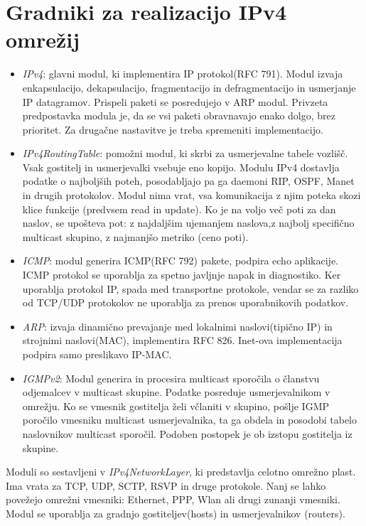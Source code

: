 \documentclass[11pt, a4paper, slovene]{book}
\begin{document}
\section{Gradniki za realizacijo IPv4 omrežij}
	\begin{itemize}
		\item\textit{IPv4}: glavni modul, ki implementira IP protokol(RFC 791). Modul izvaja enkapsulacijo, dekapsulacijo, fragmentacijo in defragmentacijo in usmerjanje IP datagramov. Prispeli paketi se posredujejo v ARP modul. Privzeta predpostavka modula je, da se vsi paketi obravnavajo enako dolgo, brez prioritet. Za drugačne nastavitve je treba spremeniti implementacijo.
		\item\textit{IPv4RoutingTable}: pomožni modul, ki skrbi za usmerjevalne tabele vozlišč. Vsak gostitelj in usmerjevalki vsebuje eno kopijo. Modulu IPv4 dostavlja podatke o najboljših poteh, posodabljajo pa ga daemoni RIP, OSPF, Manet in drugih protokolov. Modul nima vrat, vsa komunikacija z njim poteka skozi klice funkcije (predvsem read in update). Ko je na voljo več poti za dan naslov, se upošteva pot:
		z najdaljšim ujemanjem naslova,z najbolj specifično multicast skupino, z najmanjšo metriko (ceno poti).
		\item\textit{ICMP}: modul generira ICMP(RFC 792) pakete, podpira echo aplikacije. ICMP protokol se uporablja za spetno javljnje napak in diagnostiko. Ker uporablja protokol IP, spada med transportne protokole, vendar se za razliko od TCP/UDP protokolov ne uporablja za prenos uporabnikovih podatkov.
		\item\textit{ARP}: izvaja dinamično prevajanje med lokalnimi naslovi(tipično IP) in strojnimi naslovi(MAC), implementira RFC 826. Inet-ova implementacija podpira samo preslikavo IP-MAC.
		\item\textit{IGMPv2}: Modul generira in procesira multicast sporočila o članstvu odjemalcev v multicast skupine. Podatke posreduje usmerjevalnikom v omrežju. Ko se vmesnik gostitelja želi včlaniti v skupino, pošlje IGMP poročilo vmesniku multicast usmerjevalnika, ta ga obdela in posodobi tabelo naslovnikov multicast sporočil. Podoben postopek je ob izstopu gostitelja iz skupine.
	\end{itemize}

Moduli so sestavljeni v \textit{IPv4NetworkLayer}, ki predstavlja celotno omrežno plast. Ima vrata za TCP, UDP, SCTP, RSVP in druge protokole.  Nanj se lahko povežejo omrežni vmesniki: Ethernet, PPP, Wlan ali drugi zunanji vmesniki. Modul se uporablja za gradnjo gostiteljev(hosts) in usmerjevalnikov (routers).
\end{document}
